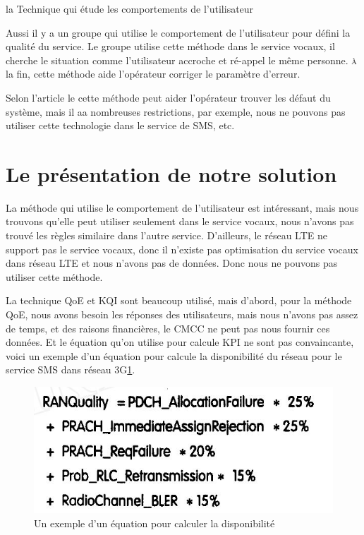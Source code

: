 \textsf{la Technique qui étude les comportements de l'utilisateur} 

Aussi il y a un groupe qui utilise le comportement de l'utilisateur pour défini la qualité du service\cite{UB}. Le groupe utilise cette méthode dans le service vocaux, il cherche le situation comme l'utilisateur accroche et ré-appel le même personne. \textsc{à} la fin, cette méthode aide l'opérateur corriger le paramètre d'erreur.

Selon l'article le cette méthode peut aider l'opérateur trouver les défaut du système, mais il aa nombreuses restrictions, par exemple, nous ne pouvons pas utiliser cette technologie dans le service de SMS, etc.



\section{Le présentation de notre solution}

La méthode qui utilise le comportement de l'utilisateur est intéressant, mais nous trouvons qu'elle peut utiliser seulement dans le service vocaux, nous n'avons pas trouvé les règles similaire dans l'autre service. D'ailleurs, le réseau LTE ne support pas le service vocaux, donc il n'existe pas optimisation du service vocaux dans réseau LTE et nous n'avons pas de données. Donc nous ne pouvons pas utiliser cette méthode.

La technique QoE et KQI sont beaucoup utilisé, mais d'abord, pour la méthode QoE, nous avons besoin les réponses des utilisateurs, mais nous n'avons pas assez de temps, et des raisons financières, le CMCC ne peut pas nous fournir ces données. Et le équation qu'on utilise pour calcule KPI ne sont pas convaincante, voici un exemple d'un équation pour calcule la disponibilité du réseau pour le service SMS dans réseau 3G\ref{fig:kpi}. 
\begin{figure}[H]
\centering
\includegraphics[width=0.7\linewidth]{images/kpi}
\caption{Un exemple d'un équation pour calculer la disponibilité}
\label{fig:kpi}
\end{figure}

